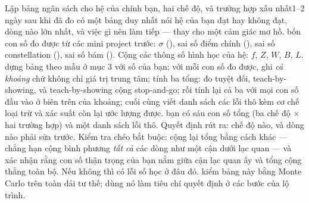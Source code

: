 \documentclass[../../marker.tex]{subfiles}
\begin{document}
\begin{duan}{Lập bảng ngân sách cho hệ của chính bạn, hai chế độ, và trường hợp xấu nhất}{1--2 ngày sau khi đã đo}
\dmt có một bảng duy nhất nói hệ của bạn đạt hay không đạt, dòng nào lớn nhất, và việc gì nên làm tiếp --- thay cho một cảm giác mơ hồ.
\ddl bốn con số đo được từ các mini project trước: \(\sigma\) (), sai số điểm chính (), sai số constellation (), sai số bám (). Cộng các thông số hình học của hệ: \(f\), \(Z\), \(W\), \(B\), \(L\).
\dbc dựng bảng theo mẫu ở mục 3 với số của bạn; với mỗi con số đo được, ghi \emph{cả khoảng} chứ không chỉ giá trị trung tâm; tính ba tổng: đo tuyệt đối, teach-by-showing, và teach-by-showing cộng stop-and-go; rồi tính lại cả ba với mọi con số đầu vào ở biên trên của khoảng; cuối cùng viết danh sách các lỗi thô kèm cơ chế loại trừ và xác suất còn lại ước lượng được.
\dxk bạn có sáu con số tổng (ba chế độ \(\times\) hai trường hợp) và một danh sách lỗi thô. Quyết định rút ra: chế độ nào, và dòng nào phải sửa trước. Kiểm tra chéo bắt buộc: cộng lại tổng bằng cách khác --- chẳng hạn cộng bình phương \emph{tất cả} các dòng như một cận dưới lạc quan --- và xác nhận rằng con số thận trọng của bạn nằm giữa cận lạc quan ấy và tổng cộng thẳng toàn bộ. Nếu không thì có lỗi số học ở đâu đó.
\dnv {} kiểm bảng này bằng Monte Carlo trên toàn dải tư thế;  dùng nó làm tiêu chí quyết định ở các bước của lộ trình.
\end{duan}
\end{document}
